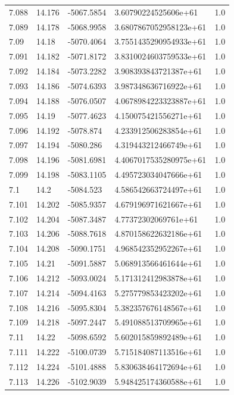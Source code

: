 \begin{tabular}{lllll}
7.088 & 14.176 & -5067.5854 & 3.60790224525606e+61 & 1.0 \\
7.089 & 14.178 & -5068.9958 & 3.6807867052958123e+61 & 1.0 \\
7.09 & 14.18 & -5070.4064 & 3.7551435290954933e+61 & 1.0 \\
7.091 & 14.182 & -5071.8172 & 3.8310024603759533e+61 & 1.0 \\
7.092 & 14.184 & -5073.2282 & 3.908393843721387e+61 & 1.0 \\
7.093 & 14.186 & -5074.6393 & 3.987348636716922e+61 & 1.0 \\
7.094 & 14.188 & -5076.0507 & 4.0678984223323887e+61 & 1.0 \\
7.095 & 14.19 & -5077.4623 & 4.150075421556271e+61 & 1.0 \\
7.096 & 14.192 & -5078.874 & 4.233912506283854e+61 & 1.0 \\
7.097 & 14.194 & -5080.286 & 4.319443212466749e+61 & 1.0 \\
7.098 & 14.196 & -5081.6981 & 4.4067017535280975e+61 & 1.0 \\
7.099 & 14.198 & -5083.1105 & 4.495723034047666e+61 & 1.0 \\
7.1 & 14.2 & -5084.523 & 4.586542663724497e+61 & 1.0 \\
7.101 & 14.202 & -5085.9357 & 4.679196971621667e+61 & 1.0 \\
7.102 & 14.204 & -5087.3487 & 4.77372302069761e+61 & 1.0 \\
7.103 & 14.206 & -5088.7618 & 4.870158622632186e+61 & 1.0 \\
7.104 & 14.208 & -5090.1751 & 4.968542352952267e+61 & 1.0 \\
7.105 & 14.21 & -5091.5887 & 5.068913566461644e+61 & 1.0 \\
7.106 & 14.212 & -5093.0024 & 5.171312412983878e+61 & 1.0 \\
7.107 & 14.214 & -5094.4163 & 5.275779853423202e+61 & 1.0 \\
7.108 & 14.216 & -5095.8304 & 5.382357676148567e+61 & 1.0 \\
7.109 & 14.218 & -5097.2447 & 5.491088513709965e+61 & 1.0 \\
7.11 & 14.22 & -5098.6592 & 5.602015859892489e+61 & 1.0 \\
7.111 & 14.222 & -5100.0739 & 5.715184087113516e+61 & 1.0 \\
7.112 & 14.224 & -5101.4888 & 5.830638464172694e+61 & 1.0 \\
7.113 & 14.226 & -5102.9039 & 5.948425174360588e+61 & 1.0 \\

\end{tabular}
